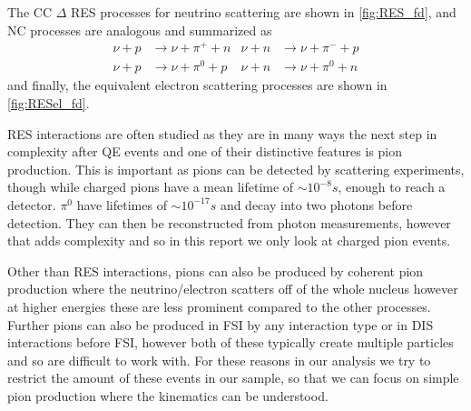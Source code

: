 \documentclass[a4paper,12pt]{article}
\begin{document}
The CC $\Delta$ RES processes for neutrino scattering are shown in \cref{fig:RES_fd}, and NC processes are analogous and summarized as
\begin{align}
    \nu + p &\rightarrow \nu + \pi^+ + n & \nu + n &\rightarrow \nu + \pi^- + p \\
    \nu + p &\rightarrow \nu + \pi^0 + p & \nu + n &\rightarrow \nu + \pi^0 + n
\end{align}
and finally, the equivalent electron scattering processes are shown in \cref{fig:RESel_fd}.

RES interactions are often studied as they are in many ways the next step in complexity after QE events and one of their distinctive features is pion production.
This is important as pions can be detected by scattering experiments, though while charged pions have a mean lifetime of $\sim 10^{-8} \si{s}$, enough to reach a detector.
$\pi^0$ have lifetimes of $\sim 10^{-17} \si{s}$ \cite{particledatagroupReviewParticlePhysics2022} and decay into two photons before detection.
They can then be reconstructed from photon measurements, however that adds complexity and so in this report we only look at charged pion events.

Other than RES interactions, pions can also be produced by coherent pion production where the neutrino/electron scatters off of the whole nucleus \cite{sogarwalCoherentPionProduction2022,higueraMeasurementCoherentProduction2014} however at higher energies these are less prominent compared to the other processes.
Further pions can also be produced in FSI by any interaction type or in DIS interactions before FSI, however both of these typically create multiple particles and so are difficult to work with.
For these reasons in our analysis we try to restrict the amount of these events in our sample, so that we can focus on simple pion production where the kinematics can be understood.
\end{document}
